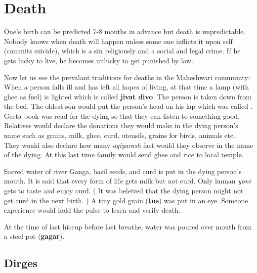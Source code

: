 \section{Death} 
One's birth can be predicted 7-8 months in advance but death is unpredictable.
Nobody knows when death will happen unless some one inflicts it upon self
(commits suicide), which is a sin religiously and a social and legal crime. If
he gets lucky to live, he becomes unlucky to get punished by law.

Now let us see the prevalant traditions for deaths in the Maheshwari community:
When a person falls ill and has left all hopes of living, at that time a lamp
(with ghee as fuel) is lighted which is called \textbf{jivat divo}. The person
is taken down from the bed. The oldest son would put the person's head on his
lap which was called . Geeta book was read for the dying so
that they can listen to something good. Relatives would declare the donations
they would make in the dying person's name such as grains, milk, ghee, curd,
utensils, grains for birds, animals etc. They would also declare how many
\textit{agiyarash} fast would they observe in the name of the dying. At this
last time family would send ghee and rice to local temple.

Sacred water of river Ganga, basil seeds, and curd is put in the dying person's
mouth. It is said that every form of life gets milk but not curd. Only human
\textit{yoni} gets to taste and enjoy curd. ( It was beleived that the dying
person might not get curd in the next birth. ) A tiny gold grain (\textbf{tus})
was put in an eye. Someone experience would hold the pulse to learn and verify
death.

At the time of last hiccup before last breathe, water was poured over mouth
from a steel pot (\textbf{gagar}).

\subsection{Dirges}
